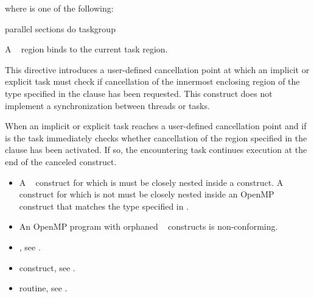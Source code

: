 where  is one of the following:

\begin{indentedcodelist}
parallel
sections
do
taskgroup
\end{indentedcodelist}
\fortranspecificend

\binding
A ~ region binds to the current task region.

\descr
This directive introduces a user-defined cancellation point at which an implicit or 
explicit task must check if cancellation of the innermost enclosing region of the type 
specified in the clause has been requested. This construct does not implement a 
synchronization between threads or tasks.

When an implicit or explicit task reaches a user-defined cancellation point and if 
 is  the task immediately checks whether cancellation of the region 
specified in the clause has been activated. If so, the encountering task continues 
execution at the end of the canceled construct. 

\restrictions
\begin{itemize}
\item A ~ construct for which  is 
 must be closely nested inside a  construct. A 
~ construct for which  
is not  must be closely 
nested inside an OpenMP construct that matches the type specified in 
.

\item An OpenMP program with orphaned ~ constructs is 
non-conforming. 
\end{itemize}

\begin{samepage}
\crossreferences
\begin{itemize}
\item {}, see 
.

\item {} construct, see 
.

\item {} routine, see 
.
\end{itemize}
\end{samepage}









